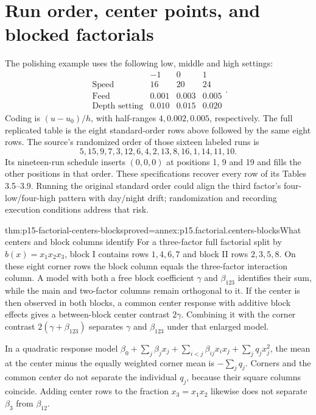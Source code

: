 \section{Run order, center points, and blocked factorials}
\label{sec:p15-factorial-execution}

The polishing example uses the following low, middle and high settings:
\[
\begin{array}{c|rrr}
 &-1&0&1\\\hline
\text{Speed}&16&20&24\\
\text{Feed}&0.001&0.003&0.005\\
\text{Depth setting}&0.010&0.015&0.020
\end{array}.
\]
Coding is \((u-u_0)/h\), with half-ranges \(4,0.002,0.005\),
respectively. The full replicated table is the eight standard-order rows
above followed by the same eight rows. The source's randomized order of
those sixteen labeled runs is
\[
 5,15,9,7,3,12,6,4,2,13,8,16,1,14,11,10.
\]
Its nineteen-run schedule inserts \((0,0,0)\) at positions 1, 9 and 19
and fills the other positions in that order. These specifications recover
every row of its Tables 3.5--3.9. Running the original standard order could
align the third factor's four-low/four-high pattern with day/night drift;
randomization and recording execution conditions address that risk.

\begin{hbtheorem}{thm:p15-factorial-centers-blocks}{proved=annex:p15.factorial.centers-blocks}{What centers and block columns identify}
For a three-factor full factorial split by \(b(x)=x_1x_2x_3\), block I
contains rows \(1,4,6,7\) and block II rows \(2,3,5,8\).
On these eight corner rows the block column equals the three-factor
interaction column. A model with
both a free block coefficient \(\gamma\) and \(\beta_{123}\) identifies
their sum, while the main and two-factor columns remain orthogonal to it.
If the center is then observed in both blocks, a common center response
with additive block effects gives a between-block center contrast
\(2\gamma\). Combining it with the corner contrast
\(2(\gamma+\beta_{123})\) separates \(\gamma\) and \(\beta_{123}\)
under that enlarged model.

In a quadratic response model
\(\beta_0+\sum_j\beta_jx_j+\sum_{i<j}\beta_{ij}x_ix_j
 +\sum_jq_jx_j^2\), the mean at the center minus the equally weighted
corner mean is \(-\sum_jq_j\). Corners and the common center do not
separate the individual \(q_j\), because their square columns coincide.
Adding center rows to the fraction \(x_3=x_1x_2\) likewise does not
separate \(\beta_3\) from \(\beta_{12}\).
\end{hbtheorem}

